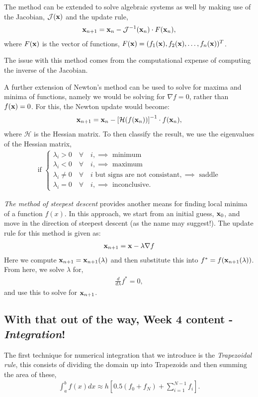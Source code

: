 \documentclass[11pt,a4paper]{report}
\begin{document}
	The method can be extended to solve algebraic systems as well by making use of the Jacobian, $\mathcal{J}(\mathbf{x})$ and the update rule,
	\begin{align}
	\mathbf{x}_{n+1} = \mathbf{x}_n - \mathcal{J}^{-1}(\mathbf{x}_n) \cdot F(\mathbf{x}_n),
	\end{align}
	where $F(\mathbf{x})$ is the vector of functions, $F(\mathbf{x})=(f_1(\mathbf{x}), f_2(\mathbf{x}),\dots,f_n(\mathbf{x}))^T$.
	
	The issue with this method comes from the computational expense of computing the inverse of the Jacobian. 
	
	A further extension of Newton's method can be used to solve for maxima and minima of functions, namely we would be solving for $\nabla f = 0$, rather than $f(\mathbf{x})=0$. For this, the Newton update would become:
	\begin{align}
	\mathbf{x}_{n+1} = \mathbf{x}_n - \left[\mathcal{H}(f(\mathbf{x}_n))\right]^{-1} \cdot f(\mathbf{x}_n),
	\end{align}
	where $\mathcal{H}$ is the Hessian matrix. To then classify the result, we use the eigenvalues of the Hessian matrix,
	\begin{align}
	\text{if } \begin{cases}
	\lambda_i > 0 \quad \forall \quad i, \implies \text{ minimum} \\
	\lambda_i < 0 \quad \forall \quad i, \implies \text{ maximum} \\
	\lambda_i \neq 0 \quad \forall \quad i \text{ but signs are not consistant}, \implies \text{ saddle} \\
	\lambda_i = 0 \quad \forall \quad i, \implies \text{ inconclusive.} 
	\end{cases}
	\end{align}
	
	\textit{The method of steepest descent} provides another means for finding local minima of a function $f(x)$. In this approach, we start from an initial guess, $\mathbf{x}_0$, and move in the direction of steepest descent (as the name may suggest!). The update rule for this method is given as:
	\begin{align}
	\mathbf{x}_{n+1} = \mathbf{x} - \lambda \nabla f
	\end{align}
	Here we compute $\mathbf{x}_{n+1} = \mathbf{x}_{n+1}(\lambda)$ and then substitute this into $f^*=f(\mathbf{x}_{n+1}(\lambda))$. From here, we solve $\lambda$ for, 
	\begin{align}
	\frac{d}{d\lambda} f^* = 0,
	\end{align}
	and use this to solve for $\mathbf{x}_{n+1}$.
	
	\subsection{With that out of the way, Week 4 content - \textit{Integration}!}
	The first technique for numerical integration that we introduce is the \textit{Trapezoidal rule}, this consists of dividing the domain up into Trapezoids and then summing the area of these,
	\begin{align}
	\int_{a}^{b} f(x) dx \approx h \left[0.5(f_0 + f_N) + \sum_{i=1}^{N-1} f_i\right].
	\end{align}
	
\end{document}
